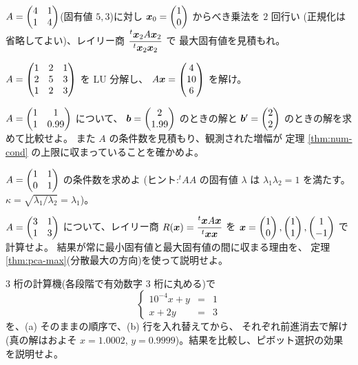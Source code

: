 \begin{mondai}[基本]\label{q:num-ex4}
$A = \begin{pmatrix}4 & 1 \\ 1 & 4\end{pmatrix}$(固有値 $5, 3$)に対し
$\bm{x}_0 = \begin{pmatrix}1 \\ 0\end{pmatrix}$ からべき乗法を $2$ 回行い
(正規化は省略してよい)、レイリー商
$\dfrac{{}^t\bm{x}_2 A\bm{x}_2}{{}^t\bm{x}_2\bm{x}_2}$ で
最大固有値を見積もれ。
\end{mondai}

\begin{mondai}[標準]\label{q:num-ex5}
$A = \begin{pmatrix}1 & 2 & 1 \\ 2 & 5 & 3 \\ 1 & 2 & 3\end{pmatrix}$ を LU 分解し、
$A\bm{x} = \begin{pmatrix}4 \\ 10 \\ 6\end{pmatrix}$ を解け。
\end{mondai}

\begin{mondai}[標準]\label{q:num-ex6}
$A = \begin{pmatrix}1 & 1 \\ 1 & 0.99\end{pmatrix}$ について、
$\bm{b} = \begin{pmatrix}2 \\ 1.99\end{pmatrix}$ のときの解と
$\bm{b}' = \begin{pmatrix}2 \\ 2\end{pmatrix}$ のときの解を求めて比較せよ。
また $A$ の条件数を見積もり、観測された増幅が
定理 \ref{thm:num-cond} の上限に収まっていることを確かめよ。
\end{mondai}

\begin{mondai}[標準]\label{q:num-ex7}
$A = \begin{pmatrix}1 & 1 \\ 0 & 1\end{pmatrix}$ の条件数を求めよ
(ヒント:${}^tAA$ の固有値 $\lambda$ は
$\lambda_1\lambda_2 = 1$ を満たす。$\kappa = \sqrt{\lambda_1/\lambda_2}
= \lambda_1$)。
\end{mondai}

\begin{mondai}[標準]\label{q:num-ex8}
$A = \begin{pmatrix}3 & 1 \\ 1 & 3\end{pmatrix}$ について、レイリー商
$R(\bm{x}) = \dfrac{{}^t\bm{x}A\bm{x}}{{}^t\bm{x}\bm{x}}$ を
$\bm{x} = \begin{pmatrix}1 \\ 0\end{pmatrix}, \begin{pmatrix}1 \\ 1\end{pmatrix}, \begin{pmatrix}1 \\ -1\end{pmatrix}$ で計算せよ。
結果が常に最小固有値と最大固有値の間に収まる理由を、
定理 \ref{thm:pca-max}(分散最大の方向)を使って説明せよ。
\end{mondai}

\begin{mondai}[発展]\label{q:num-ex9}
$3$ 桁の計算機(各段階で有効数字 $3$ 桁に丸める)で
\[
\left\{
\begin{array}{rcl}
10^{-4}x + y &=& 1 \\
x + 2y &=& 3
\end{array}
\right.
\]
を、(a) そのままの順序で、(b) 行を入れ替えてから、
それぞれ前進消去で解け(真の解はおよそ $x = 1.0002$,
$y = 0.9999$)。結果を比較し、ピボット選択の効果を説明せよ。
\end{mondai}

